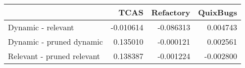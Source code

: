 \begin{tabular}{lrrr}
\toprule
 & TCAS & Refactory & QuixBugs \\
\midrule
Dynamic - relevant & -0.010614 & -0.086313 & 0.004743 \\
Dynamic - pruned dynamic & 0.135010 & -0.000121 & 0.002561 \\
Relevant - pruned relevant & 0.138387 & -0.001224 & -0.002800 \\
\bottomrule
\end{tabular}
